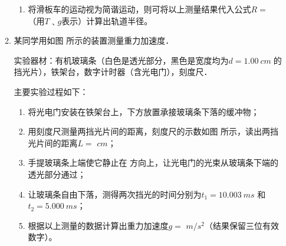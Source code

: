 \begin{enumerate}
\begin{enumerate}
\begin{enumerate}
\item 
将滑板车的运动视为简谐运动，则可将以上测量结果代入公式$ R= $ \underlinegap （用$ T $﹑$ g $表示）计算出轨道半径。

	
\end{enumerate}





\item 
某同学用如图  所示的装置测量重力加速度．
\begin{figure}[h!]
	\centering
\begin{subfigure}{0.4\linewidth}
	\centering
	 
	\caption{}\label{2020海南1402a}
\end{subfigure}
\begin{subfigure}{0.4\linewidth}
	\centering
	 
	\caption{}\label{2020海南1402b}
\end{subfigure}

\end{figure}

实验器材：有机玻璃条（白色是透光部分，黑色是宽度均为$ d=1.00 \ cm $的挡光片），铁架台，数字计时器（含光电门），刻度尺． 

主要实验过程如下： 

\begin{enumerate}
	\item
将光电门安装在铁架台上，下方放置承接玻璃条下落的缓冲物；

 \item 
 用刻度尺测量两挡光片间的距离，刻度尺的示数如图  所示，读出两挡光片间的距离$ L= $ \underlinegap $ cm $； 
 
 \item 
 手提玻璃条上端使它静止在 \underlinegap 方向上，让光电门的光束从玻璃条下端的透光部分通过； 
 
 \item 
 让玻璃条自由下落，测得两次挡光的时间分别为$t_{1}=10.003 \ ms$ 和 $t_{2}=5.000 \ ms$；
 
 \item 
 根据以上测量的数据计算出重力加速度$ g= $ \underlinegap $ m/s^{2}  $（结果保留三位有效数字）。
 


\end{enumerate}
\end{enumerate}
\end{enumerate}
